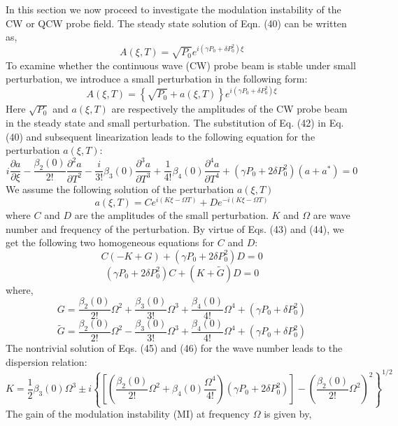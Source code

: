 \documentclass[12pt,a4paper]{article}
\begin{document}
In this section we now proceed to investigate the modulation instability of the CW or QCW probe field. The steady state solution of Eqn. (40) can be written as,
\begin{equation}
A(\xi, T) = \sqrt{P_0} e^{i (\gamma P_0 + \delta P_0^2) \xi}
\end{equation}
To examine whether the continuous wave (CW) probe beam is stable under small perturbation, we introduce a small perturbation in the following form:
\begin{equation}
A(\xi, T) = \left\{ \sqrt{P_0} + a(\xi, T) \right\} e^{i (\gamma P_0 + \delta P_0^2) \xi}
\end{equation}
Here \( \sqrt{P_0} \) and \( a(\xi, T) \) are respectively the amplitudes of the CW probe beam in the steady state and small perturbation. The substitution of Eq. (42) in Eq. (40) and subsequent linearization leads to the following equation for the perturbation \( a(\xi, T) \):
\begin{equation}
i \frac{\partial a}{\partial \xi} - \frac{\beta_2(0)}{2!} \frac{\partial^2 a}{\partial T^2} - \frac{i}{3!} \beta_3(0) \frac{\partial^3 a}{\partial T^3} + \frac{1}{4!} \beta_4(0) \frac{\partial^4 a}{\partial T^4} + (\gamma P_0 + 2 \delta P_0^2)(a + a^*) = 0
\end{equation}
We assume the following solution of the perturbation \( a(\xi, T) \)
\begin{equation}
a(\xi, T) = C e^{i(K \xi - \Omega T)} + D e^{-i(K \xi - \Omega T)}
\end{equation}
where \( C \) and \( D \) are the amplitudes of the small perturbation. \( K \) and \( \Omega \) are wave number and frequency of the perturbation. By virtue of Eqs. (43) and (44), we get the following two homogeneous equations for \( C \) and \( D \):
\begin{equation}
C(-K + G) + (\gamma P_0 + 2 \delta P_0^2) D = 0
\end{equation}
\begin{equation}
(\gamma P_0 + 2 \delta P_0^2) C + (K + \tilde{G}) D = 0
\end{equation}
where,
\[
G = \frac{\beta_2(0)}{2!} \Omega^2 + \frac{\beta_3(0)}{3!} \Omega^3 + \frac{\beta_4(0)}{4!} \Omega^4 + (\gamma P_0 + \delta P_0^2)
\]
\[
\tilde{G} = \frac{\beta_2(0)}{2!} \Omega^2 - \frac{\beta_3(0)}{3!} \Omega^3 + \frac{\beta_4(0)}{4!} \Omega^4 + (\gamma P_0 + \delta P_0^2)
\]
The nontrivial solution of Eqs. (45) and (46) for the wave number leads to the dispersion relation:
\begin{equation}
K = \frac{1}{2} \beta_3(0) \Omega^3 \pm i {\left\{ \left[ \left( \frac{\beta_2(0)}{2!} \Omega^2 + \beta_4(0) \frac{\Omega^4}{4!} \right) \left( \gamma P_0 + 2 \delta P_0^2 \right) \right] - {\left( \frac{\beta_2(0)}{2!} \Omega^2 \right)}^2 \right\}}^{1/2}
\end{equation}
The gain of the modulation instability (MI) at frequency \( \Omega \) is given by,
\end{document}
